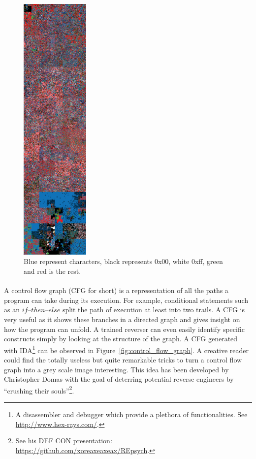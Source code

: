\begin{figure}
\begin{minipage}[b]{0.4\textwidth}
		\includegraphics[width=0.3\textwidth]{reverse_engineering/tcpview_byteclass.png}
		\caption{Blue represent characters, black represents 0x00, white 0xff, green and red is the rest.}
		\label{fig:byteclass}
	\end{minipage}
\end{figure}


\paragraph{}
A control flow graph (CFG for short) is a representation of all the paths a program can take during its execution. For example, conditional statements such as an $if–then–else$ split the path of execution at least into two trails. A CFG is very useful as it shows these branches in a directed graph and gives insight on how the program can unfold. A trained reverser can even easily identify specific constructs simply by looking at the structure of the graph. A CFG generated with IDA\footnote{A disassembler and debugger which provide a plethora of functionalities. See \url{http://www.hex-rays.com/}.} can be observed in Figure~\ref{fig:control_flow_graph}. A creative reader could find the totally useless but quite remarkable tricks to turn a control flow graph into a grey scale image interesting. This idea has been developed by Christopher Domas with the goal of deterring potential reverse engineers by “crushing their souls”\footnote{See his DEF CON presentation: \url{https://github.com/xoreaxeaxeax/REpsych}.}.

